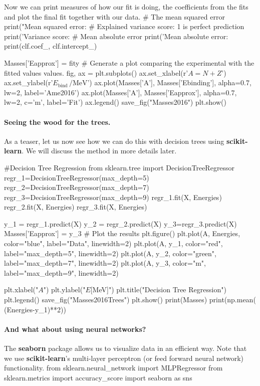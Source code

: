 \documentclass[%
oneside,                 %
final,                   %
10pt]{article}
\begin{document}
Now we can print measures of how our fit is doing, the coefficients from the fits and plot the final fit together with our data.
\bpycod
# The mean squared error                               
print("Mean squared error: %
# Explained variance score: 1 is perfect prediction                                 
print('Variance score: %
# Mean absolute error                                                           
print('Mean absolute error: %
print(clf.coef_, clf.intercept_)

Masses['Eapprox']  = fity
# Generate a plot comparing the experimental with the fitted values values.
fig, ax = plt.subplots()
ax.set_xlabel(r'$A = N + Z$')
ax.set_ylabel(r'$E_\mathrm{bind}\,/\mathrm{MeV}$')
ax.plot(Masses['A'], Masses['Ebinding'], alpha=0.7, lw=2,
            label='Ame2016')
ax.plot(Masses['A'], Masses['Eapprox'], alpha=0.7, lw=2, c='m',
            label='Fit')
ax.legend()
save_fig("Masses2016")
plt.show()
\epycod


\paragraph{Seeing the wood for the trees.}
As a teaser, let us now see how we can do this with decision trees using \textbf{scikit-learn}. We will discuss the method in more details later.


\bpycod

#Decision Tree Regression
from sklearn.tree import DecisionTreeRegressor
regr_1=DecisionTreeRegressor(max_depth=5)
regr_2=DecisionTreeRegressor(max_depth=7)
regr_3=DecisionTreeRegressor(max_depth=9)
regr_1.fit(X, Energies)
regr_2.fit(X, Energies)
regr_3.fit(X, Energies)


y_1 = regr_1.predict(X)
y_2 = regr_2.predict(X)
y_3=regr_3.predict(X)
Masses['Eapprox'] = y_3
# Plot the results
plt.figure()
plt.plot(A, Energies, color="blue", label="Data", linewidth=2)
plt.plot(A, y_1, color="red", label="max_depth=5", linewidth=2)
plt.plot(A, y_2, color="green", label="max_depth=7", linewidth=2)
plt.plot(A, y_3, color="m", label="max_depth=9", linewidth=2)

plt.xlabel("$A$")
plt.ylabel("$E$[MeV]")
plt.title("Decision Tree Regression")
plt.legend()
save_fig("Masses2016Trees")
plt.show()
print(Masses)
print(np.mean( (Energies-y_1)**2))
\epycod


\paragraph{And what about using neural networks?}
The \textbf{seaborn} package allows us to visualize data in an efficient way. Note that we use \textbf{scikit-learn}'s multi-layer perceptron (or feed forward neural network) 
functionality.
\bpycod
from sklearn.neural_network import MLPRegressor
from sklearn.metrics import accuracy_score
import seaborn as sns
\end{document}

